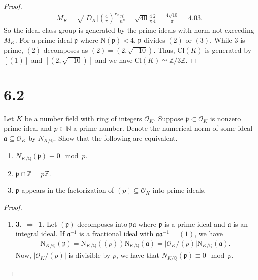 \documentclass[a4paper]{article}
\begin{document}
\begin{enumerate}
\begin{proof}
\begin{align*}
                M_K = \sqrt{|D_K|} \left(\frac{4}{\pi}\right)^{r_2} \frac{n!}{n^n} = \sqrt{40} \frac{4}{\pi} \frac{2}{4} = \frac{4 \sqrt{10}}{\pi} = 4.03 \text{.}
            \end{align*}
            So the ideal class group is generated by the prime ideals with norm not exceeding \(M_K\). For a prime ideal \(\mathfrak{p}\) where \(\mathrm{N}(\mathfrak{p}) < 4\), \(\mathfrak{p}\) divides \((2)\) or \((3)\). While \(3\) is prime, \((2)\) decomposes as \((2) = (2, \sqrt{-10})\). Thus, \(\mathrm{Cl}(K)\) is generated by \([(1)]\) and \([(2, \sqrt{-10})]\) and we have \(\mathrm{Cl}(K) \simeq \mathbb{Z}/3\mathbb{Z}\).
        \end{proof}
\end{enumerate}

\section*{6.2}
Let \(K\) be a number field with ring of integers \(\mathcal{O}_K\). Suppose \(\mathfrak{p} \subset \mathcal{O}_K\) is nonzero prime ideal and \(p \in \mathbb{N}\) a prime number. Denote the numerical norm of some ideal \(\mathfrak{a} \subseteq \mathcal{O}_K\) by \(N_{K / \mathbb{Q}}\). Show that the following are equivalent.
\begin{enumerate}
    \item \(N_{K/\mathbb{Q}} (\mathfrak{p}) \equiv 0 \mod{p}\).
    \item \(\mathfrak{p} \cap \mathbb{Z} = p \mathbb{Z}\).
    \item \(\mathfrak{p}\) appears in the factorization of \((p) \subseteq \mathcal{O}_K\) into prime ideals.
\end{enumerate}
\begin{proof}
    \begin{enumerate}
        \item \textbf{3. \(\Rightarrow\) 1.} Let \(\mathfrak{(p)}\) decomposes into \(\mathfrak{p} \mathfrak{a}\) where \(\mathfrak{p}\) is a prime ideal and \(\mathfrak{a}\) is an integral ideal. If \(\mathfrak{a}^{-1}\) is a fractional ideal with \(\mathfrak{a}\mathfrak{a}^{-1} = (1)\), we have
        \begin{align*}
            \mathrm{N}_{K/\mathbb{Q}}(\mathfrak{p}) = \mathrm{N}_{K/\mathbb{Q}}((p)) \mathrm{N}_{K/\mathbb{Q}}(\mathfrak{a}) = |\mathcal{O}_K / (p)|\mathrm{N}_{K/\mathbb{Q}}(\mathfrak{a}) \text{.}
        \end{align*}
        Now, \(|\mathcal{O}_K / (p)|\) is divisible by \(p\), we have that \(N_{K/\mathbb{Q}}(\mathfrak{p}) \equiv 0 \mod{p}\).
    \end{enumerate}
\end{proof}
\end{document}
